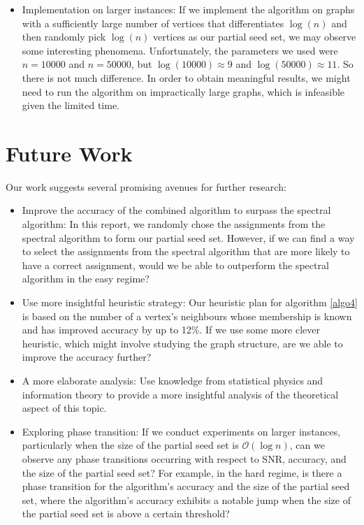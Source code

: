 \begin{itemize}
    \item Implementation on larger instances: If we implement the algorithm on graphs with a sufficiently large number of vertices that differentiates $\log(n)$ and then randomly pick $\log(n)$ vertices as our partial seed set, we may observe some interesting phenomena. Unfortunately, the parameters we used were $n=10000$ and $n=50000$, but $\log(10000) \approx 9$ and $\log(50000) \approx 11$. So there is not much difference. In order to obtain meaningful results, we might need to run the algorithm on impractically large graphs, which is infeasible given the limited time.
\end{itemize}
\section{Future Work}
Our work suggests several promising avenues for further research:
\begin{itemize}
    \item  Improve the accuracy of the combined algorithm to surpass the spectral algorithm: In this report, we randomly chose the assignments from the spectral algorithm to form our partial seed set. However, if we can find a way to select the assignments from the spectral algorithm that are more likely to have a correct assignment, would we be able to outperform the spectral algorithm in the easy regime?
    \item Use more insightful heuristic strategy: Our heuristic plan for algorithm \ref{algo4} is based on the number of a vertex's neighbours whose membership is known and has improved accuracy by up to 12\%. If we use some more clever heuristic, which might involve studying the graph structure, are we able to improve the accuracy further?
    \item A more elaborate analysis: Use knowledge from statistical physics and information theory to provide a more insightful analysis of the theoretical aspect of this topic.
    \item Exploring phase transition: If we conduct experiments on larger instances, particularly when the size of the partial seed set is $\mathcal{O}(\log n)$, can we observe any phase transitions occurring with respect to SNR, accuracy, and the size of the partial seed set? For example, in the hard regime, is there a phase transition for the algorithm's accuracy and the size of the partial seed set, where the algorithm's accuracy exhibits a notable jump when the size of the partial seed set is above a certain threshold?
\end{itemize}
